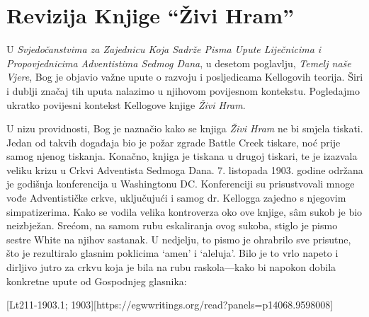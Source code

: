 \chapter{Revizija Knjige “Živi Hram”}

U \textit{Svjedočanstvima za Zajednicu Koja Sadrže Pisma Upute Liječnicima i Propovjednicima Adventistima Sedmog Dana}, u desetom poglavlju, \textit{Temelj naše Vjere}, Bog je objavio važne upute o razvoju i posljedicama Kellogovih teorija. Širi i dublji značaj tih uputa nalazimo u njihovom povijesnom kontekstu. Pogledajmo ukratko povijesni kontekst Kellogove knjige \textit{Živi Hram}.

U nizu providnosti, Bog je naznačio kako se knjiga \textit{Živi Hram} ne bi smjela tiskati. Jedan od takvih događaja bio je požar zgrade Battle Creek tiskare, noć prije samog njenog tiskanja. Konačno, knjiga je tiskana u drugoj tiskari, te je izazvala veliku krizu u Crkvi Adventista Sedmoga Dana. 7. listopada 1903. godine održana je godišnja konferencija u Washingtonu DC. Konferenciji su prisustvovali mnoge vođe Adventističke crkve, uključujući i samog dr. Kellogga zajedno s njegovim simpatizerima. Kako se vodila velika kontroverza oko ove knjige, sâm sukob je bio neizbježan. Srećom, na samom rubu eskaliranja ovog sukoba, stiglo je pismo sestre White na njihov sastanak. U nedjelju, to pismo je ohrabrilo sve prisutne, što je rezultiralo glasnim poklicima ‘amen’ i ‘aleluja’. Bilo je to vrlo napeto i dirljivo jutro za crkvu koja je bila na rubu raskola—kako bi napokon dobila konkretne upute od Gospodnjeg glasnika:

[Lt211-1903.1; 1903][https://egwwritings.org/read?panels=p14068.9598008]

